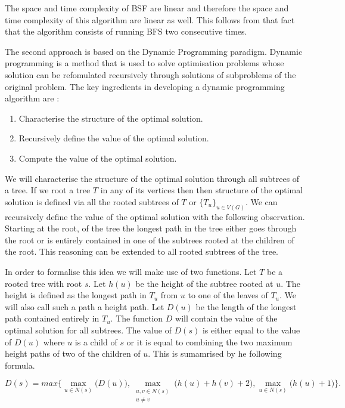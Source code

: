 The space and time complexity of BSF are linear \cite{intro-to-algo} and therefore the space and time complexity of this algorithm are linear as well. This follows from that fact that the algorithm consists of running BFS two consecutive times.

The second approach is based on the Dynamic Programming paradigm. Dynamic programming is a method that is used to solve optimisation problems whose solution can be refomulated recursively through solutions of subproblems of the original problem. The key ingredients in developing a dynamic programming algorithm are \cite{intro-to-algo}:

\begin{enumerate}
    \item Characterise the structure of the optimal solution.
    \item Recursively define the value of the optimal solution.
    \item Compute the value of the optimal solution.
\end{enumerate}

We will characterise the structure of the optimal solution through all subtrees of a tree. If we root a tree $T$ in any of its vertices then then structure of the optimal solution is defined via all the rooted subtrees of $T$ or $\{T_u\}_{u \in V(G)}$. We can recursively define the value of the optimal solution with the following observation. Starting at the root, of the tree the longest path in the tree either goes through the root or is entirely contained in one of the subtrees rooted at the children of the root. This reasoning can be extended to all rooted subtrees of the tree.

In order to formalise this idea we will make use of two functions. Let $T$ be a rooted tree with root $s$. Let $h(u)$ be the height of the subtree rooted at $u$. The height is defined as the longest path in $T_u$ from $u$ to one of the leaves of $T_u$. We will also call such a path a height path. Let $D(u)$ be the length of the longest path contained entirely in $T_u$. The function $D$ will contain the value of the optimal solution for all subtrees. The value of $D(s)$ is either equal to the value of $D(u)$ where $u$ is a child of $s$ or it is equal to combining the two maximum height paths of two of the children of $u$. This is sumamrised by he following formula.

$$ D(s) = max\bigg\{ \max\limits_{u \in N(s)}\bigg(D(u)\bigg), \max\limits_{\substack{u, v \in N(s) \\ u \ne v}} \bigg(h(u) + h(v) + 2\bigg) , \max\limits_{u \in N(s)}\bigg(h(u) + 1 \bigg)   \bigg\}. $$

